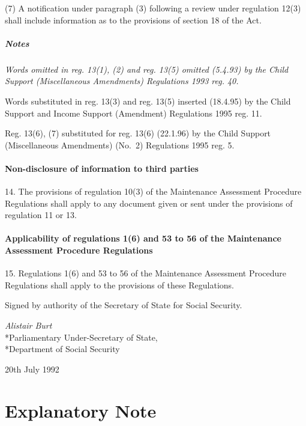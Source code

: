 \documentclass[a4paper]{article}
\newcommand\amendment[1]{\subsubsection*{Notes}{\itshape\frenchspacing\footnotesize #1 \par}}
\begin{document}
(7) A notification under paragraph (3) following a review under regulation 12(3) shall include information as to the provisions of section 18 of the Act.

\amendment{
Words 
omitted in reg. 13(1), (2) and reg. 13(5) omitted (5.4.93) by the Child Support (Miscellaneous Amendments) Regulations 1993 reg. 40.

Words substituted in reg. 13(3) and reg. 13(5) inserted (18.4.95) by the Child Support and Income Support (Amendment) Regulations 1995 reg. 11.

Reg. 13(6), (7) substituted for reg. 13(6) (22.1.96) by the Child Support (Miscellaneous Amendments) (No.\ 2) Regulations 1995 reg. 5.
}

\subsection[14. Non-disclosure of information to third parties]{Non-disclosure of information to third parties}

14.  The provisions of regulation 10(3) of the Maintenance Assessment Procedure Regulations shall apply to any document given or sent under the provisions of regulation 11 or 13.

\subsection[15. Applicability of regulations 1(6) and 53 to 56 of the Maintenance Assessment Procedure Regulations]{Applicability of regulations 1(6) and 53 to 56 of the Maintenance Assessment Procedure Regulations}

15.  Regulations 1(6) and 53 to 56 of the Maintenance Assessment Procedure Regulations shall apply to the provisions of these Regulations.

\bigskip

Signed by authority of the Secretary of State for Social Security.

{\raggedleft
\emph{Alistair Burt}\\*Parliamentary Under-Secretary of State,\\*Department of Social Security

}

20th July 1992

\part{Explanatory Note}
\end{document}
